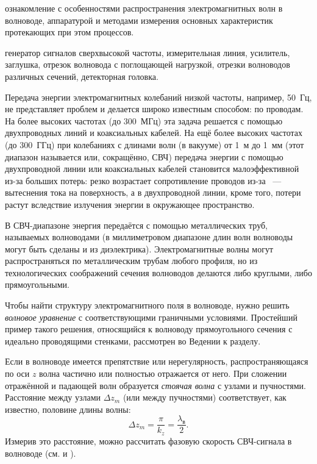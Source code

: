
\begin{lab:aim} ознакомление с особенностями распространения
    электромагнитных волн в волноводе, аппаратурой и методами измерения основных
    характеристик протекающих при этом процессов. 
\end{lab:aim}

\begin{lab:equipment} генератор сигналов сверхвысокой частоты, измерительная
    линия, усилитель, заглушка, отрезок волновода с поглощающей нагрузкой, отрезки
    волноводов различных сечений, детекторная головка. 
\end{lab:equipment}

Передача энергии электромагнитных колебаний низкой частоты, например, 50~Гц, не
представляет проблем и делается широко известным способом: по проводам. На более
высоких частотах (до 300~МГц) эта задача решается с помощью двухпроводных линий
и коаксиальных кабелей. На ещё более высоких частотах (до 300~ГГц) при
колебаниях с длинами волн (в вакууме) от 1~м до 1~мм (этот диапазон
называется  или, сокращённо, СВЧ)
передача энергии с помощью двухпроводной линии или коаксиальных кабелей
становится малоэффективной из-за больших потерь: резко возрастает сопротивление
проводов из-за ~--- вытеснения тока на поверхность, а в
двухпроводной линии, кроме того, потери растут вследствие излучения энергии в
окружающее пространство.

В СВЧ-диапазоне энергия передаётся с помощью металлических труб, называемых
волноводами (в миллиметровом диапазоне длин волн волноводы могут быть сделаны и
из диэлектрика). Электромагнитные волны могут распространяться по металлическим
трубам любого профиля, но из технологических соображений сечения волноводов
делаются либо круглыми, либо прямоугольными.

Чтобы найти структуру электромагнитного поля в волноводе, нужно решить \emph{волновое
уравнение} с соответствующими граничными условиями. Простейший пример такого решения,
относящийся к волноводу прямоугольного сечения с идеально проводящими стенками,
рассмотрен во Ведении к разделу.

Если в волноводе имеется препятствие или нерегулярность, распространяющаяся по оси
$z$ волна частично или полностью отражается от него. При сложении 
отражённой и падающей волн образуется \emph{стоячая волна} с узлами
и пучностями. Расстояние между узлами $\Delta z_m$ (или между пучностями)
соответствует, как известно, половине длины волны:
\begin{equation}
\Delta z_m = \frac{\pi}{k_z} = \frac{\lambda_{в}}{2}.
\end{equation}
Измерив это расстояние, можно рассчитать фазовую скорость 
СВЧ-сигнала в волноводе (см.  и ).

